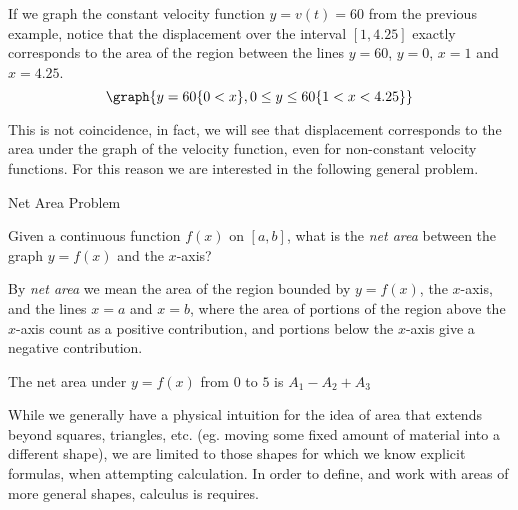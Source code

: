 \documentclass{ximera}
\begin{document}
If we graph the constant velocity function $y=v(t)=60$ from the previous example, notice that the displacement over the interval $[1,4.25]$ exactly corresponds to the area of the region between the lines $y=60$, $y=0$, $x=1$ and $x=4.25$.
\[
\graph{y=60\{0< x\},0\leq y\leq 60\{1< x< 4.25\}}
\]

This is not coincidence, in fact, we will see that displacement corresponds to the area under the graph of the velocity function, even for non-constant velocity functions. For this reason we are interested in the following general problem.

\begin{problem}{Net Area Problem}

Given a continuous function $f(x)$ on $[a,b]$, what is the \emph{net area} between the graph $y=f(x)$ and the $x$-axis?

By \emph{net area} we mean the area of the region bounded by $y=f(x)$, the $x$-axis, and the lines $x=a$ and $x=b$, where the area of portions of the region above the $x$-axis count as a positive contribution, and portions below the $x$-axis give a negative contribution.
\end{problem}

\begin{image}
  \end{image}
The net area under $y=f(x)$ from $0$ to $5$ is $A_1-A_2+A_3$

While we generally have a physical intuition for the idea of area that extends beyond squares, triangles, etc. (eg. moving some fixed amount of material into a different shape), we are limited to those shapes for which we know explicit formulas, when attempting calculation. In order to define, and work with areas of more general shapes, calculus is requires.
\end{document}
